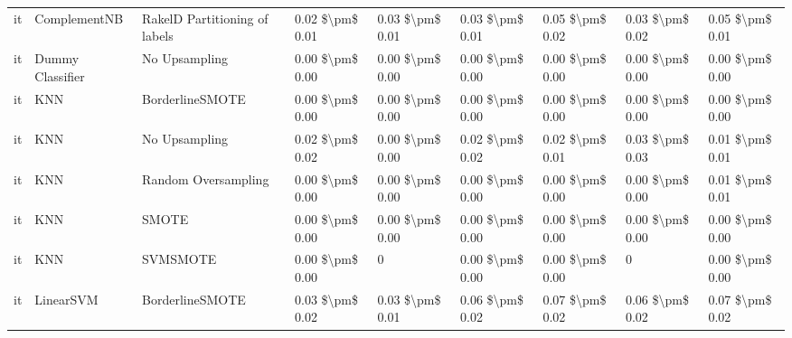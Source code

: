 \begin{tabular}{lllllllll}
      it &                    ComplementNB & RakelD Partitioning of labels & 0.02 \$\textbackslash pm\$ 0.01 &           0.03 \$\textbackslash pm\$ 0.01 &       0.03 \$\textbackslash pm\$ 0.01 &        0.05 \$\textbackslash pm\$ 0.02 &                         0.03 \$\textbackslash pm\$ 0.02 &     0.05 \$\textbackslash pm\$ 0.01 \\
      it &                Dummy Classifier &                 No Upsampling & 0.00 \$\textbackslash pm\$ 0.00 &           0.00 \$\textbackslash pm\$ 0.00 &       0.00 \$\textbackslash pm\$ 0.00 &        0.00 \$\textbackslash pm\$ 0.00 &                         0.00 \$\textbackslash pm\$ 0.00 &     0.00 \$\textbackslash pm\$ 0.00 \\
      it &                             KNN &               BorderlineSMOTE & 0.00 \$\textbackslash pm\$ 0.00 &           0.00 \$\textbackslash pm\$ 0.00 &       0.00 \$\textbackslash pm\$ 0.00 &        0.00 \$\textbackslash pm\$ 0.00 &                         0.00 \$\textbackslash pm\$ 0.00 &     0.00 \$\textbackslash pm\$ 0.00 \\
      it &                             KNN &                 No Upsampling & 0.02 \$\textbackslash pm\$ 0.02 &           0.00 \$\textbackslash pm\$ 0.00 &       0.02 \$\textbackslash pm\$ 0.02 &        0.02 \$\textbackslash pm\$ 0.01 &                         0.03 \$\textbackslash pm\$ 0.03 &     0.01 \$\textbackslash pm\$ 0.01 \\
      it &                             KNN &           Random Oversampling & 0.00 \$\textbackslash pm\$ 0.00 &           0.00 \$\textbackslash pm\$ 0.00 &       0.00 \$\textbackslash pm\$ 0.00 &        0.00 \$\textbackslash pm\$ 0.00 &                         0.00 \$\textbackslash pm\$ 0.00 &     0.01 \$\textbackslash pm\$ 0.01 \\
      it &                             KNN &                         SMOTE & 0.00 \$\textbackslash pm\$ 0.00 &           0.00 \$\textbackslash pm\$ 0.00 &       0.00 \$\textbackslash pm\$ 0.00 &        0.00 \$\textbackslash pm\$ 0.00 &                         0.00 \$\textbackslash pm\$ 0.00 &     0.00 \$\textbackslash pm\$ 0.00 \\
      it &                             KNN &                      SVMSMOTE & 0.00 \$\textbackslash pm\$ 0.00 &                         0 &       0.00 \$\textbackslash pm\$ 0.00 &        0.00 \$\textbackslash pm\$ 0.00 &                                       0 &     0.00 \$\textbackslash pm\$ 0.00 \\
      it &                       LinearSVM &               BorderlineSMOTE & 0.03 \$\textbackslash pm\$ 0.02 &           0.03 \$\textbackslash pm\$ 0.01 &       0.06 \$\textbackslash pm\$ 0.02 &        0.07 \$\textbackslash pm\$ 0.02 &                         0.06 \$\textbackslash pm\$ 0.02 &     0.07 \$\textbackslash pm\$ 0.02 \\

\end{tabular}
